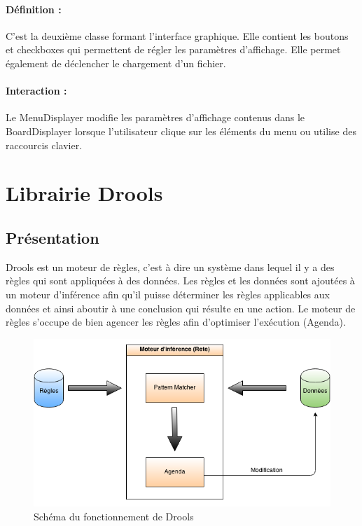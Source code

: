 			\paragraph{Définition :}
			C'est la deuxième classe formant l'interface graphique. Elle contient les boutons et checkboxes qui permettent
			de régler les paramètres d'affichage. Elle permet également de déclencher le chargement d'un fichier.
			\paragraph{Interaction :}
			Le MenuDisplayer modifie les paramètres d'affichage contenus dans le BoardDisplayer lorsque l'utilisateur clique
			sur les éléments du menu ou utilise des raccourcis clavier.


	\clearpage

	\section{Librairie Drools}

		\subsection{Présentation}
			Drools est un moteur de règles, c'est à dire un système dans lequel il y a des règles qui sont appliquées à des données. 
			Les règles et les données sont ajoutées	à un moteur d'inférence afin qu'il puisse déterminer les règles applicables aux données et ainsi aboutir à une conclusion qui résulte en une action.
			Le moteur de règles s'occupe de bien agencer les règles afin d'optimiser l'exécution (Agenda).

		
			\begin{figure}[!h]
			    \caption{Schéma du fonctionnement de Drools}
			    \centerline{\includegraphics[scale=0.7]{images/architecture/drools_schema.png}}
			\end{figure}


